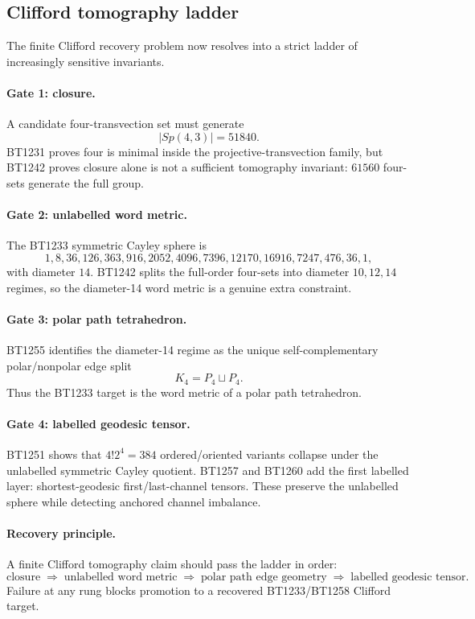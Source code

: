 \subsection{Clifford tomography ladder}
\label{sec:bt1261-clifford-tomography-ladder}

The finite Clifford recovery problem now resolves into a strict ladder of increasingly sensitive invariants.

\paragraph{Gate 1: closure.}
A candidate four-transvection set must generate
\[
|Sp(4,3)|=51840.
\]
BT1231 proves four is minimal inside the projective-transvection family, but BT1242 proves closure alone is not a sufficient tomography invariant: \(61560\) four-sets generate the full group.

\paragraph{Gate 2: unlabelled word metric.}
The BT1233 symmetric Cayley sphere is
\[
1,8,36,126,363,916,2052,4096,7396,12170,16916,7247,476,36,1,
\]
with diameter \(14\).  BT1242 splits the full-order four-sets into diameter \(10,12,14\) regimes, so the diameter-14 word metric is a genuine extra constraint.

\paragraph{Gate 3: polar path tetrahedron.}
BT1255 identifies the diameter-14 regime as the unique self-complementary polar/nonpolar edge split
\[
K_4=P_4\sqcup P_4.
\]
Thus the BT1233 target is the word metric of a polar path tetrahedron.

\paragraph{Gate 4: labelled geodesic tensor.}
BT1251 shows that \(4!2^4=384\) ordered/oriented variants collapse under the unlabelled symmetric Cayley quotient.  BT1257 and BT1260 add the first labelled layer: shortest-geodesic first/last-channel tensors.  These preserve the unlabelled sphere while detecting anchored channel imbalance.

\paragraph{Recovery principle.}
A finite Clifford tomography claim should pass the ladder in order:
\[
\boxed{
\text{closure}
\;\Longrightarrow\;
\text{unlabelled word metric}
\;\Longrightarrow\;
\text{polar path edge geometry}
\;\Longrightarrow\;
\text{labelled geodesic tensor}.
}
\]
Failure at any rung blocks promotion to a recovered BT1233/BT1258 Clifford target.
